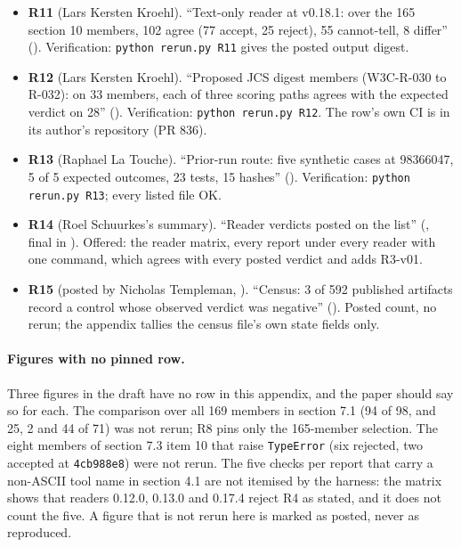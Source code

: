 \begin{flushleft}
\begin{itemize}
\item \textbf{R11} (Lars Kersten Kroehl). ``Text-only reader at v0.18.1: over the 165 section 10 members, 102 agree (77 accept, 25 reject), 55 cannot-tell, 8 differ'' (). Verification: \texttt{python rerun.py R11} gives the posted output digest.
\item \textbf{R12} (Lars Kersten Kroehl). ``Proposed JCS digest members (W3C-R-030 to R-032): on 33 members, each of three scoring paths agrees with the expected verdict on 28'' (). Verification: \texttt{python rerun.py R12}. The row's own CI is in its author's repository (PR 836).
\item \textbf{R13} (Raphael La Touche). ``Prior-run route: five synthetic cases at 98366047, 5 of 5 expected outcomes, 23 tests, 15 hashes'' (). Verification: \texttt{python rerun.py R13}; every listed file OK.
\item \textbf{R14} (Roel Schuurkes's summary). ``Reader verdicts posted on the list'' (, final in ). Offered: the reader matrix, every report under every reader with one command, which agrees with every posted verdict and adds R3-v01.
\item \textbf{R15} (posted by Nicholas Templeman, ). ``Census: 3 of 592 published artifacts record a control whose observed verdict was negative'' (). Posted count, no rerun; the appendix tallies the census file's own state fields only.
\end{itemize}
\end{flushleft}

\paragraph{Figures with no pinned row.} Three figures in the draft have no row in this appendix, and the paper should say so for each. The comparison over all 169 members in section 7.1 (94 of 98, and 25, 2 and 44 of 71) was not rerun; R8 pins only the 165-member selection. The eight members of section 7.3 item 10 that raise \texttt{TypeError} (six rejected, two accepted at \texttt{4cb988e8}) were not rerun. The five checks per report that carry a non-ASCII tool name in section 4.1 are not itemised by the harness: the matrix shows that readers 0.12.0, 0.13.0 and 0.17.4 reject R4 as stated, and it does not count the five. A figure that is not rerun here is marked as posted, never as reproduced.
